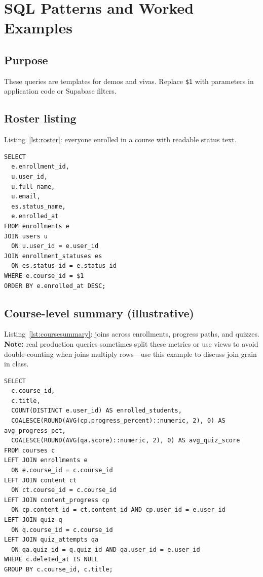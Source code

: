 
\chapter{SQL Patterns and Worked Examples}
\label{ch:sqlpatterns}

\section{Purpose}
These queries are templates for demos and vivas. Replace \texttt{\$1} with parameters in application code or Supabase filters.

\section{Roster listing}
Listing~\ref{lst:roster}: everyone enrolled in a course with readable status text.

\begin{lstlisting}[caption={Students enrolled in one course (with status label)},label={lst:roster}]
SELECT
  e.enrollment_id,
  u.user_id,
  u.full_name,
  u.email,
  es.status_name,
  e.enrolled_at
FROM enrollments e
JOIN users u
  ON u.user_id = e.user_id
JOIN enrollment_statuses es
  ON es.status_id = e.status_id
WHERE e.course_id = $1
ORDER BY e.enrolled_at DESC;
\end{lstlisting}

\section{Course-level summary (illustrative)}
Listing~\ref{lst:coursesummary}: joins across enrollments, progress paths, and quizzes. \textbf{Note:} real production queries sometimes split these metrics or use views to avoid double-counting when joins multiply rows---use this example to discuss join grain in class.

\begin{lstlisting}[caption={Illustrative per-course aggregates (discuss join grain carefully)},label={lst:coursesummary}]
SELECT
  c.course_id,
  c.title,
  COUNT(DISTINCT e.user_id) AS enrolled_students,
  COALESCE(ROUND(AVG(cp.progress_percent)::numeric, 2), 0) AS avg_progress_pct,
  COALESCE(ROUND(AVG(qa.score)::numeric, 2), 0) AS avg_quiz_score
FROM courses c
LEFT JOIN enrollments e
  ON e.course_id = c.course_id
LEFT JOIN content ct
  ON ct.course_id = c.course_id
LEFT JOIN content_progress cp
  ON cp.content_id = ct.content_id AND cp.user_id = e.user_id
LEFT JOIN quiz q
  ON q.course_id = c.course_id
LEFT JOIN quiz_attempts qa
  ON qa.quiz_id = q.quiz_id AND qa.user_id = e.user_id
WHERE c.deleted_at IS NULL
GROUP BY c.course_id, c.title;
\end{lstlisting}

